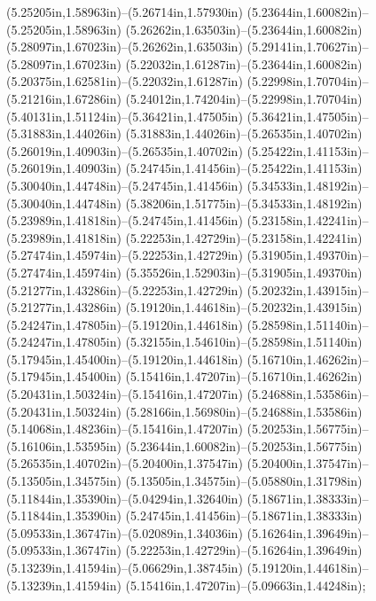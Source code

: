 (5.25205in,1.58963in)--(5.26714in,1.57930in) (5.23644in,1.60082in)--(5.25205in,1.58963in) (5.26262in,1.63503in)--(5.23644in,1.60082in) (5.28097in,1.67023in)--(5.26262in,1.63503in) (5.29141in,1.70627in)--(5.28097in,1.67023in) (5.22032in,1.61287in)--(5.23644in,1.60082in) (5.20375in,1.62581in)--(5.22032in,1.61287in) (5.22998in,1.70704in)--(5.21216in,1.67286in) (5.24012in,1.74204in)--(5.22998in,1.70704in) (5.40131in,1.51124in)--(5.36421in,1.47505in) (5.36421in,1.47505in)--(5.31883in,1.44026in) (5.31883in,1.44026in)--(5.26535in,1.40702in) (5.26019in,1.40903in)--(5.26535in,1.40702in) (5.25422in,1.41153in)--(5.26019in,1.40903in) (5.24745in,1.41456in)--(5.25422in,1.41153in) (5.30040in,1.44748in)--(5.24745in,1.41456in) (5.34533in,1.48192in)--(5.30040in,1.44748in) (5.38206in,1.51775in)--(5.34533in,1.48192in) (5.23989in,1.41818in)--(5.24745in,1.41456in) (5.23158in,1.42241in)--(5.23989in,1.41818in) (5.22253in,1.42729in)--(5.23158in,1.42241in) (5.27474in,1.45974in)--(5.22253in,1.42729in) (5.31905in,1.49370in)--(5.27474in,1.45974in) (5.35526in,1.52903in)--(5.31905in,1.49370in) (5.21277in,1.43286in)--(5.22253in,1.42729in) (5.20232in,1.43915in)--(5.21277in,1.43286in) (5.19120in,1.44618in)--(5.20232in,1.43915in) (5.24247in,1.47805in)--(5.19120in,1.44618in) (5.28598in,1.51140in)--(5.24247in,1.47805in) (5.32155in,1.54610in)--(5.28598in,1.51140in) (5.17945in,1.45400in)--(5.19120in,1.44618in) (5.16710in,1.46262in)--(5.17945in,1.45400in) (5.15416in,1.47207in)--(5.16710in,1.46262in) (5.20431in,1.50324in)--(5.15416in,1.47207in) (5.24688in,1.53586in)--(5.20431in,1.50324in) (5.28166in,1.56980in)--(5.24688in,1.53586in) (5.14068in,1.48236in)--(5.15416in,1.47207in) (5.20253in,1.56775in)--(5.16106in,1.53595in) (5.23644in,1.60082in)--(5.20253in,1.56775in) (5.26535in,1.40702in)--(5.20400in,1.37547in) (5.20400in,1.37547in)--(5.13505in,1.34575in) (5.13505in,1.34575in)--(5.05880in,1.31798in) (5.11844in,1.35390in)--(5.04294in,1.32640in) (5.18671in,1.38333in)--(5.11844in,1.35390in) (5.24745in,1.41456in)--(5.18671in,1.38333in) (5.09533in,1.36747in)--(5.02089in,1.34036in) (5.16264in,1.39649in)--(5.09533in,1.36747in) (5.22253in,1.42729in)--(5.16264in,1.39649in) (5.13239in,1.41594in)--(5.06629in,1.38745in) (5.19120in,1.44618in)--(5.13239in,1.41594in) (5.15416in,1.47207in)--(5.09663in,1.44248in);
